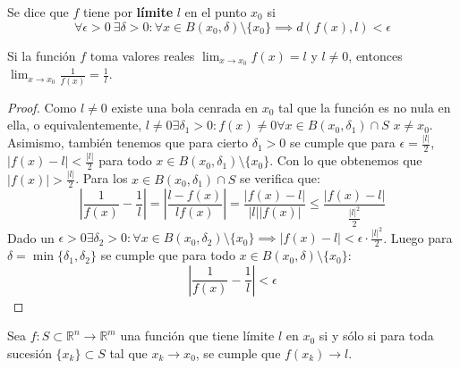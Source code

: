 \begin{definición}[Limite]
    Se dice que $f$ tiene por \textbf{límite} $l$ en el punto $x_0$ si
    $$\forall \epsilon > 0 \ \exists \delta > 0 : \forall x \in B(x_0, \delta) \setminus \{x_0\} \implies d(f(x), l) < \epsilon$$
\end{definición}

\begin{teorema}
    Si la función $f$ toma valores reales $\lim_{x \to x_0} f(x) = l$ y $l \neq 0$, entonces $\lim_{x \to x_0} \frac{1}{f(x)} = \frac{1}{l}$.
\end{teorema}
\begin{proof}
    Como $l \neq 0$ existe una bola cenrada en $x_0$ tal que la función es no nula en ella, o equivalentemente, $l \neq 0 \exists \delta_1 > 0 : f(x) \neq 0 \forall x \in B(x_0, \delta_1) \cap S$  $x \neq x_0$. \\
    Asimismo, también tenemos que para cierto $\delta_1 > 0$ se cumple que para $\epsilon = \frac{|l|}{2}$, $|f(x) - l| < \frac{|l|}{2}$ para todo $x \in B(x_0, \delta_1) \setminus \{x_0\}$. Con lo que obtenemos que $|f(x)| > \frac{|l|}{2}$. Para los $x \in B(x_0, \delta_1) \cap S$ se verifica que: 
    \[
    \left|\frac{1}{f(x)} - \frac{1}{l}\right| = \left|\frac{l - f(x)}{lf(x)}\right| = \frac{|f(x) - l|}{|l||f(x)|} \leq \frac{|f(x) - l|}{\frac{|l|^2}{2}}
    \]
    Dado un $\epsilon > 0 \exists \delta_2 > 0 : \forall x \in B(x_0, \delta_2) \setminus \{x_0\} \implies |f(x) - l| < \epsilon \cdot \frac{|l|^2}{2}$. Luego para $\delta = \min\{\delta_1, \delta_2\}$ se cumple que para todo $x \in B(x_0, \delta) \setminus \{x_0\}$:
    $$\left|\frac{1}{f(x)} - \frac{1}{l}\right| < \epsilon$$
\end{proof}

\begin{teorema}
    Sea $f : S \subset \mathbb{R}^n \to \mathbb{R}^m$ una función que tiene límite $l$ en $x_0$ si y sólo si para toda sucesión \( \{x_k\} \subset S \) tal que \( x_k \to x_0 \), se cumple que \( f(x_k) \to l \).
\end{teorema}

